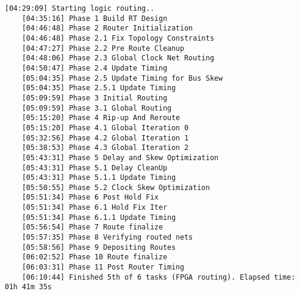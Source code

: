 \begin{lstlisting}[caption=Содержимое файла v++\_vinc.log для измененного проекта, label={log2}]
	[04:29:09] Starting logic routing..
	[04:35:16] Phase 1 Build RT Design
	[04:46:48] Phase 2 Router Initialization
	[04:46:48] Phase 2.1 Fix Topology Constraints
	[04:47:27] Phase 2.2 Pre Route Cleanup
	[04:48:06] Phase 2.3 Global Clock Net Routing
	[04:50:47] Phase 2.4 Update Timing
	[05:04:35] Phase 2.5 Update Timing for Bus Skew
	[05:04:35] Phase 2.5.1 Update Timing
	[05:09:59] Phase 3 Initial Routing
	[05:09:59] Phase 3.1 Global Routing
	[05:15:20] Phase 4 Rip-up And Reroute
	[05:15:20] Phase 4.1 Global Iteration 0
	[05:32:56] Phase 4.2 Global Iteration 1
	[05:38:53] Phase 4.3 Global Iteration 2
	[05:43:31] Phase 5 Delay and Skew Optimization
	[05:43:31] Phase 5.1 Delay CleanUp
	[05:43:31] Phase 5.1.1 Update Timing
	[05:50:55] Phase 5.2 Clock Skew Optimization
	[05:51:34] Phase 6 Post Hold Fix
	[05:51:34] Phase 6.1 Hold Fix Iter
	[05:51:34] Phase 6.1.1 Update Timing
	[05:56:54] Phase 7 Route finalize
	[05:57:35] Phase 8 Verifying routed nets
	[05:58:56] Phase 9 Depositing Routes
	[06:02:52] Phase 10 Route finalize
	[06:03:31] Phase 11 Post Router Timing
	[06:10:44] Finished 5th of 6 tasks (FPGA routing). Elapsed time: 01h 41m 35s 
	

\end{lstlisting}
